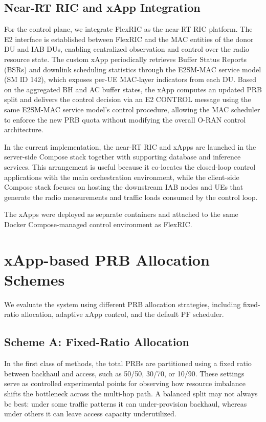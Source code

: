 \documentclass[conference, a4paper]{IEEEtran}
\begin{document}
\subsection{Near-RT RIC and xApp Integration}
For the control plane, we integrate FlexRIC as the near-RT RIC platform. The E2 interface is established between FlexRIC and the MAC entities of the donor DU and IAB DUs, enabling centralized observation and control over the radio resource state. The custom xApp periodically retrieves Buffer Status Reports (BSRs) and downlink scheduling statistics through the E2SM-MAC service model (SM ID 142), which exposes per-UE MAC-layer indicators from each DU. Based on the aggregated BH and AC buffer states, the xApp computes an updated PRB split and delivers the control decision via an E2 CONTROL message using the same E2SM-MAC service model's control procedure, allowing the MAC scheduler to enforce the new PRB quota without modifying the overall O-RAN control architecture.

In the current implementation, the near-RT RIC and xApps are launched in the server-side Compose stack together with supporting database and inference services. This arrangement is useful because it co-locates the closed-loop control applications with the main orchestration environment, while the client-side Compose stack focuses on hosting the downstream IAB nodes and UEs that generate the radio measurements and traffic loads consumed by the control loop.

The xApps were deployed as separate containers and attached to the same Docker Compose-managed control environment as FlexRIC.

\section{xApp-based PRB Allocation Schemes}
We evaluate the system using different PRB allocation strategies, including fixed-ratio allocation, adaptive xApp control, and the default PF scheduler.

\subsection{Scheme A: Fixed-Ratio Allocation}
In the first class of methods, the total PRBs are partitioned using a fixed ratio between backhaul and access, such as 50/50, 30/70, or 10/90. These settings serve as controlled experimental points for observing how resource imbalance shifts the bottleneck across the multi-hop path. A balanced split may not always be best: under some traffic patterns it can under-provision backhaul, whereas under others it can leave access capacity underutilized.
\end{document}
